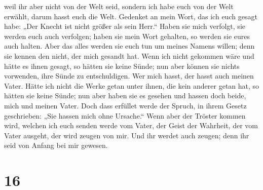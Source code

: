 weil ihr aber nicht von der Welt seid, sondern ich habe euch von der
Welt erwählt, darum hasst euch die Welt.  Gedenket an
mein Wort, das ich euch gesagt habe: „Der Knecht ist nicht größer als
sein Herr.`` Haben sie mich verfolgt, sie werden euch auch verfolgen;
haben sie mein Wort gehalten, so werden sie eures auch halten.
 Aber das alles werden sie euch tun um meines Namens
willen; denn sie kennen den nicht, der mich gesandt hat. 
Wenn ich nicht gekommen wäre und hätte es ihnen gesagt, so hätten sie
keine Sünde; nun aber können sie nichts vorwenden, ihre Sünde zu
entschuldigen.  Wer mich hasst, der hasst auch meinen
Vater.  Hätte ich nicht die Werke getan unter ihnen, die
kein anderer getan hat, so hätten sie keine Sünde; nun aber haben sie es
gesehen und hassen doch beide, mich und meinen Vater. 
Doch dass erfüllet werde der Spruch, in ihrem Gesetz geschrieben: „Sie
hassen mich ohne Ursache.``  Wenn aber der Tröster kommen
wird, welchen ich euch senden werde vom Vater, der Geist der Wahrheit,
der vom Vater ausgeht, der wird zeugen von mir.  Und ihr
werdet auch zeugen; denn ihr seid von Anfang bei mir gewesen.

\hypertarget{section-15}{%
\section{16}\label{section-15}}

